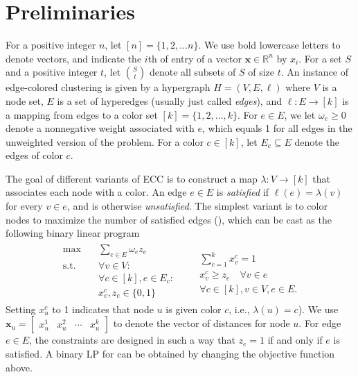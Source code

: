 \section{Preliminaries}
For a positive integer $n$, let $[n] = \{1,2, \hdots n\}$. 
We use bold lowercase letters to denote vectors, and indicate the $i$th of entry of a vector $\textbf{x} \in \mathbb{R}^n$ by $x_i$. For a set $S$ and a positive integer $t$, let ${S \choose t}$ denote all subsets of $S$ of size $t$.
An instance of edge-colored clustering is given by a hypergraph $H = (V,E, \ell)$ where $V$ is a node set, $E$ is a set of hyperedges (usually just called \emph{edges}), and $\ell \colon E \rightarrow [k]$ is a mapping from edges to a color set $[k] = \{1,2, \hdots, k\}$.  For $e \in E$, we let $\omega_e \geq 0 $ denote a nonnegative weight associated with $e$, which equals 1 for all edges in the unweighted version of the problem. For a color $c \in [k]$, let $E_c \subseteq E$ denote the edges of color $c$.

The goal of different variants of ECC is to construct a map $\lambda \colon V \rightarrow [k]$ that associates each node with a color. An edge $e \in E$ is \emph{satisfied} if $\ell(e) = \lambda(v)$ for every $v \in e$, and is otherwise \emph{unsatisfied}. The simplest variant is to color nodes to maximize the number of satisfied edges (\maxecc{}), which can be cast as the following binary linear program
\begin{align}
	\label{eq:maxecc}
\begin{aligned}
	\text{max} \quad& \textstyle \sum_{e \in E} \omega_e z_e \\
	\text{s.t.} \quad& \forall v \in V:\\
	&\forall c \in [k], e \in E_c:\\
	&x_v^c, z_e \in \{0, 1\}
\end{aligned}
\begin{aligned}
	&\\
	&\textstyle \sum_{c=1}^k x_v^c = 1 \\
	\quad &x_v^c \geq z_e \quad \forall v \in e \\
	&\forall c \in [k], v \in V, e \in E.
\end{aligned}
\end{align}
Setting $x_{u}^c$ to 1 indicates that node $u$ is given color $c$, i.e., $\lambda(u) = c$). We use $\textbf{x}_u = \begin{bmatrix} x_u^1 & x_u^2 & \cdots & x_u^k \end{bmatrix}$ to denote the vector of distances for node $u$. For edge $e \in E$, the constraints are designed in such a way that $z_e = 1$ if and only if $e$ is satisfied. A binary LP for \minecc{} can be obtained by changing the objective function above.

